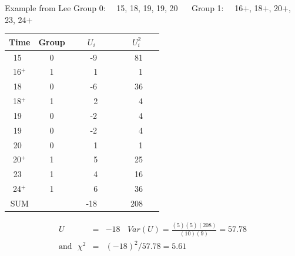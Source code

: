 \documentclass[envcountsect, 10pt, portrait, palatino]{beamer}
\begin{document}
\begin{frame}{Example from Lee}
Group 0:~~ 15, 18, 19, 19, 20 ~~ Group 1:~~ 16$+$, 18$+$, 20$+$, 23, 24$+$
\scriptsize
\begin{center}
\begin{tabular}{cccc}
\hline \hline
Time & Group & ~~~$U_i$~~~ & ~~~$U_i^2$~~~ \\ \hline
15~    & 0 & ~-9 & ~81 \\
16$^+$ & 1 & ~~1 & ~~1 \\
18~    & 0 & ~-6 & ~36 \\
18$^+$ & 1 & ~~2 & ~~4 \\
19~    & 0 & ~-2 & ~~4 \\
19~    & 0 & ~-2 & ~~4 \\
20~    & 0 & ~~1 & ~~1 \\
20$^+$ & 1 & ~~5 & ~25 \\
23~    & 1 & ~~4 & ~16 \\
24$^+$ & 1 & ~~6 & ~36 \\ \hline
SUM    &   & -18 & 208 \\ \hline \hline
\end{tabular}
\end{center}
\small
\begin{eqnarray*}
U & = & -18 ~~~~ Var(U) = \frac{(5)(5)(208)}{(10)(9)} = 57.78\\
\mbox{and}~~~ \chi^2 & = & (-18)^2/57.78 = 5.61
\end{eqnarray*}
\end{frame}
\end{document}
